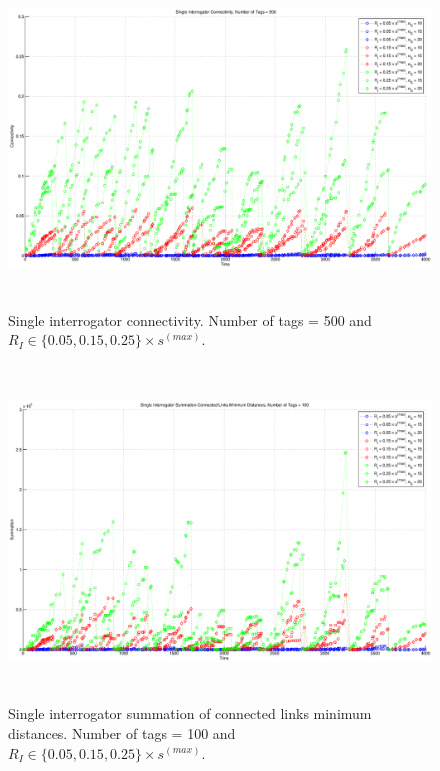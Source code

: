 \begin{figure}
\centering
\includegraphics[width=5in, height=3.5in]{Chapter_4_Figures/sin_connect_500tags_all.eps}
\caption{Single interrogator connectivity. Number of tags = 500 and $R_I \in \{0.05, 0.15, 0.25\} \times s^{(max)}$.}
\label{Figure: sin_connect_500tags_all.eps}
\end{figure}
\begin{figure}
\centering
\includegraphics[width=5in, height=3.5in]{Chapter_4_Figures/sin_min_100tags_all.eps}
\caption{Single interrogator summation of connected links minimum distances. Number of tags = 100 and $R_I \in \{0.05, 0.15, 0.25\} \times s^{(max)}$.}
\label{Figure: sin_min_100tags_all.eps}
\end{figure}
\clearpage

